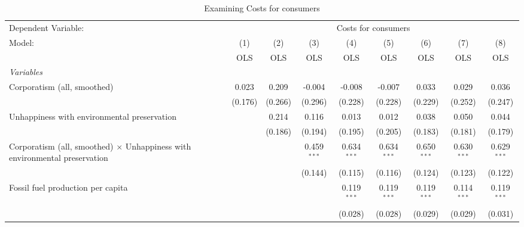 
\begin{table}[htbp]
   \caption{Examining Costs for consumers}
   \centering
   \begin{tabular}{lcccccccc}
      \toprule
      Dependent Variable: & \multicolumn{8}{c}{Costs for consumers}\\
      Model:                                                                            & (1)     & (2)     & (3)           & (4)           & (5)           & (6)           & (7)           & (8)\\  
                                                                                        &  OLS    & OLS     & OLS           & OLS           & OLS           & OLS           & OLS           & OLS\\  
      \midrule
      \emph{Variables}\\
      Corporatism (all, smoothed)                                                       & 0.023   & 0.209   & -0.004        & -0.008        & -0.007        & 0.033         & 0.029         & 0.036\\   
                                                                                        & (0.176) & (0.266) & (0.296)       & (0.228)       & (0.228)       & (0.229)       & (0.252)       & (0.247)\\   
      Unhappiness with environmental preservation                                       &         & 0.214   & 0.116         & 0.013         & 0.012         & 0.038         & 0.050         & 0.044\\   
                                                                                        &         & (0.186) & (0.194)       & (0.195)       & (0.205)       & (0.183)       & (0.181)       & (0.179)\\   
      Corporatism (all, smoothed) $\times$ Unhappiness with environmental preservation  &         &         & 0.459$^{***}$ & 0.634$^{***}$ & 0.634$^{***}$ & 0.650$^{***}$ & 0.630$^{***}$ & 0.629$^{***}$\\   
                                                                                        &         &         & (0.144)       & (0.115)       & (0.116)       & (0.124)       & (0.123)       & (0.122)\\   
      Fossil fuel production per capita                                                 &         &         &               & 0.119$^{***}$ & 0.119$^{***}$ & 0.119$^{***}$ & 0.114$^{***}$ & 0.119$^{***}$\\   
                                                                                        &         &         &               & (0.028)       & (0.028)       & (0.029)       & (0.029)       & (0.031)\\   

\end{tabular}
\end{table}
